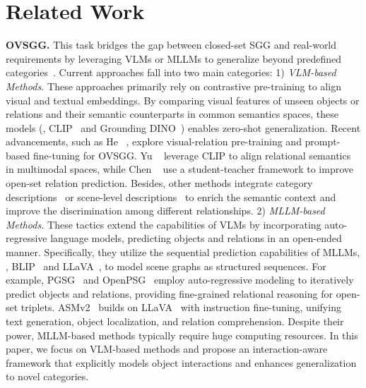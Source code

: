 \section{Related Work}


\textbf{OVSGG.}
This task bridges the gap between closed-set SGG and real-world requirements by leveraging VLMs or MLLMs to generalize beyond predefined categories~\cite{radford2021learning, liu2023grounding}. Current approaches fall into two main categories:
1) \textit{VLM-based Methods.} These approaches primarily rely on contrastive pre-training to align visual and textual embeddings. By comparing visual features of unseen objects or relations and their semantic counterparts in common semantics spaces, these models (\eg, CLIP~\cite{radford2021learning} and Grounding DINO~\cite{liu2023grounding}) enables zero-shot generalization. Recent advancements, such as He \etal~\cite{he2022towards}, explore visual-relation pre-training and prompt-based fine-tuning for OVSGG. Yu \etal~\cite{yu2023visually} leverage CLIP to align relational semantics in multimodal spaces, while Chen \etal~\cite{chen2024expanding} use a student-teacher framework to improve open-set relation prediction. Besides, other methods integrate category descriptions~\cite{li2024zero} or scene-level descriptions~\cite{chen2024scene} to enrich the semantic context and improve the discrimination among different relationships.
2) \textit{MLLM-based Methods.} These tactics extend the capabilities of VLMs by incorporating auto-regressive language models, predicting objects and relations in an open-ended manner. Specifically, they utilize the sequential prediction capabilities of MLLMs, \eg, BLIP~\cite{li2023blip} and LLaVA~\cite{liu2024visual}, to model scene graphs as structured sequences. For example, PGSG~\cite{li2024pixels} and OpenPSG~\cite{zhou2025openpsg} employ auto-regressive modeling to iteratively predict objects and relations, providing fine-grained relational reasoning for open-set triplets. ASMv2~\cite{wang2025all} builds on LLaVA~\cite{liu2024visual} with instruction fine-tuning, unifying text generation, object localization, and relation comprehension. Despite their power, MLLM-based methods typically require huge computing resources. In this paper, we focus on VLM-based methods and propose an interaction-aware framework that explicitly models object interactions and enhances generalization to novel categories.


